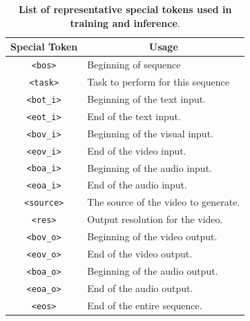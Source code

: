 

\begin{table}
\centering
\begin{tabular}{cl}
\toprule
Special Token                          & \multicolumn{1}{c}{Usage} \\
\midrule
\texttt{<bos>} & Beginning of sequence     \\
\texttt{<task>} & Task to perform for this sequence \\
\texttt{<bot\_i>}& Beginning of the text input. \\
\texttt{<eot\_i>}& End of the text input. \\
\texttt{<bov\_i>}& Beginning of the visual input. \\
\texttt{<eov\_i>}& End of the video input. \\
\texttt{<boa\_i>}& Beginning of the audio input. \\
\texttt{<eoa\_i>}& End of the audio input. \\
\texttt{<source>}& The source of the video to generate. \\
\texttt{<res>} & Output resolution for the video. \\
\texttt{<bov\_o>}& Beginning of the video output. \\
\texttt{<eov\_o>}& End of the video output. \\
\texttt{<boa\_o>}& Beginning of the audio output. \\
\texttt{<eoa\_o>}& End of the audio output. \\
\texttt{<eos>}& End of the entire sequence. \\
\bottomrule
\end{tabular}
\caption{\textbf{List of representative special tokens used in training and inference}. }
\label{tab:special_tokens}
\end{table}